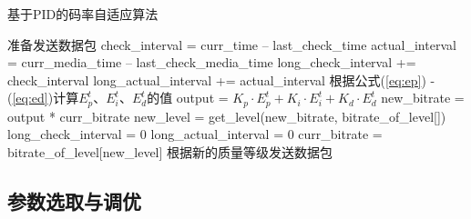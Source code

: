 \begin{algorithm}
	\caption{基于PID的码率自适应算法}
	\label{algo:control}
	\begin{algorithmic}
		\STATE 准备发送数据包
		\STATE check\_interval = curr\_time -- last\_check\_time
		\STATE actual\_interval = curr\_media\_time -- last\_check\_media\_time
		\STATE long\_check\_interval += check\_interval
		\STATE long\_actual\_interval += actual\_interval
		\STATE 根据公式(\ref{eq:ep}) - (\ref{eq:ed})计算$E_p^t$、$E_i^t$、$E_d^t$的值
		\STATE output = ${K_p} \cdot E_p^t + {K_i} \cdot E_i^t + {K_d} \cdot E_d^t$
		\STATE new\_bitrate = output * curr\_bitrate
		\STATE new\_level = get\_level(new\_bitrate, bitrate\_of\_level[])
		\STATE long\_check\_interval = 0
		\STATE long\_actual\_interval = 0
		\STATE curr\_bitrate = bitrate\_of\_level[new\_level]
		\ENDIF
		\STATE 根据新的质量等级发送数据包
	\end{algorithmic}
\end{algorithm}

\subsection{参数选取与调优}

